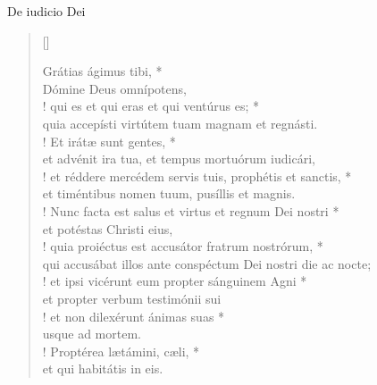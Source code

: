 


\def\greinitialformat#1{%
{\fontsize{39}{39}\selectfont #1}%
}




\vspace{0.3cm}
\begin{center}

De iudicio Dei\\
\end{center}
\begin{verse}[\versewidth]

Grátias ágimus tibi, *\\
Dómine Deus omnípotens,\\!
\vin qui es et qui eras et qui ventúrus es; *\\
\vin quia accepísti virtútem tuam magnam et regnásti.\\!
Et irátæ sunt gentes, *\\
et advénit ira tua, et tempus mortuórum iudicári,\\!
\vin et réddere mercédem servis tuis,
	prophétis et sanctis, *\\
\vin et timéntibus nomen tuum, pusíllis et magnis.\\!
Nunc facta est salus et virtus et regnum Dei nostri *\\
et potéstas Christi eius,\\!
\vin quia proiéctus est accusátor fratrum nostrórum, *\\
\vin qui accusábat illos ante conspéctum Dei nostri
	die ac nocte;\\!
et ipsi vicérunt eum propter sánguinem Agni *\\
et propter verbum testimónii sui\\!
\vin et non dilexérunt ánimas suas *\\
\vin usque ad mortem.\\!
Proptérea lætámini, cæli, *\\
et qui habitátis in eis.\\
\end{verse}
\vspace{1cm}


